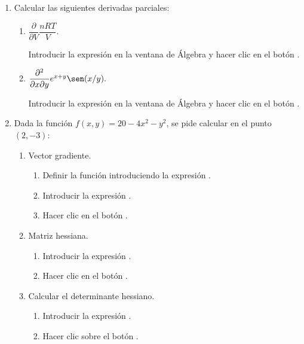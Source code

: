 \begin{enumerate}[leftmargin=*]
\item  Calcular las siguientes derivadas parciales:
\begin{enumerate}
\item  $\dfrac{\partial }{\partial V}\dfrac{nRT}{V}.$

\begin{indicacion}
Introducir la expresión  en la ventana de Álgebra y hacer clic en el botón .
\end{indicacion}

\item  $\dfrac{\partial ^{2}}{\partial x\partial y}e^{x+y}\sen(x/y).$
\begin{indicacion}
Introducir la expresión  en la ventana de Álgebra y hacer clic en el botón .
\end{indicacion}
\end{enumerate}

\item Dada la función $f(x,y)=20-4x^2-y^2$, se pide calcular en el punto $(2,-3)$:
\begin{enumerate}
\item Vector gradiente.
\begin{indicacion}
\begin{enumerate}
\item Definir la función introduciendo la expresión .
\item Introducir la expresión .
\item Hacer clic en el botón .
\end{enumerate}
\end{indicacion}

\item Matriz hessiana.
\begin{indicacion}
\begin{enumerate}
\item Introducir la expresión .
\item Hacer clic en el botón .
\end{enumerate}
\end{indicacion}

\item Calcular el determinante hessiano.
\begin{indicacion}
\begin{enumerate}
\item Introducir la expresión .
\item Hacer clic sobre el botón .
\end{enumerate}
\end{indicacion}
\end{enumerate} 



\end{enumerate}
